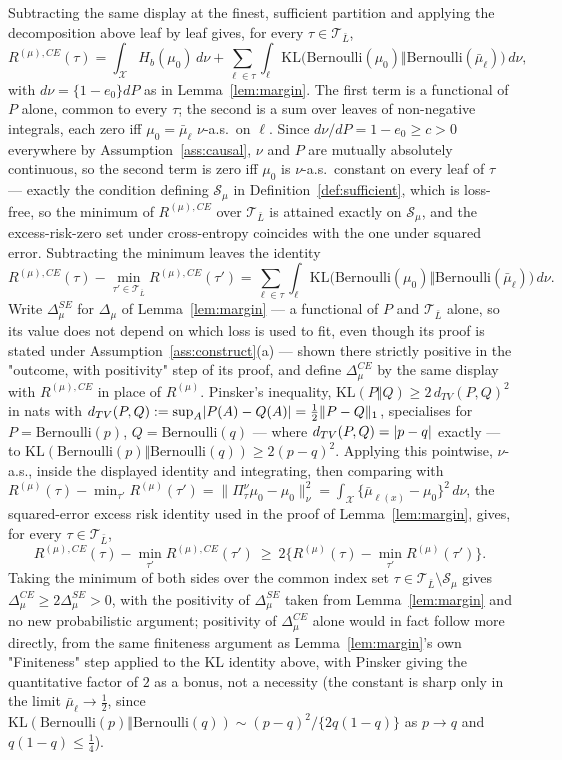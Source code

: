 \documentclass[11pt]{article}
\theoremstyle{plain}
\theoremstyle{definition}
\theoremstyle{remark}
\newcommand{\cX}{\mathcal{X}}
\newcommand{\cT}{\mathcal{T}}
\newcommand{\cS}{\mathcal{S}}
\newcommand{\ez}{e_0}
\newcommand{\mz}{\mu_0}
\DeclarePairedDelimiter{\abs}{\lvert}{\rvert}
\begin{document}
Subtracting the same display at the finest, sufficient partition and applying
the decomposition above leaf by leaf gives, for every $\tau\in\cT_{\bar L}$,
\[
  R^{(\mu),CE}(\tau)=\int_\cX H_b(\mz)\,d\nu
  +\sum_{\ell\in\tau}\int_\ell
  \mathrm{KL}\bigl(\mathrm{Bernoulli}(\mz)\Vert
  \mathrm{Bernoulli}(\bar\mu_\ell)\bigr)\,d\nu,
\]
with $d\nu=\{1-\ez\}dP$ as in Lemma~\ref{lem:margin}. The first term is a
functional of $P$ alone, common to every $\tau$; the second is a sum over
leaves of non-negative integrals, each zero iff $\mz=\bar\mu_\ell$
$\nu$-a.s.\ on $\ell$. Since $d\nu/dP=1-\ez\ge c>0$ everywhere by
Assumption~\ref{ass:causal}, $\nu$ and $P$ are mutually absolutely
continuous, so the second term is zero iff $\mz$ is
$\nu$-a.s.\ constant on every leaf of $\tau$ --- exactly the condition
defining $\cS_\mu$ in Definition~\ref{def:sufficient}, which is loss-free, so
the minimum of $R^{(\mu),CE}$ over $\cT_{\bar L}$ is attained exactly on
$\cS_\mu$, and the excess-risk-zero set under cross-entropy coincides with the
one under squared error. Subtracting the minimum leaves the identity
\[
  R^{(\mu),CE}(\tau)-\min_{\tau'\in\cT_{\bar L}}R^{(\mu),CE}(\tau')
  =\sum_{\ell\in\tau}\int_\ell
  \mathrm{KL}\bigl(\mathrm{Bernoulli}(\mz)\Vert
  \mathrm{Bernoulli}(\bar\mu_\ell)\bigr)\,d\nu.
\]
Write $\Delta_\mu^{SE}$ for $\Delta_\mu$ of Lemma~\ref{lem:margin} --- a
functional of $P$ and $\cT_{\bar L}$ alone, so its value does not depend on
which loss is used to fit, even though its proof is stated under
Assumption~\ref{ass:construct}(a) --- shown there strictly positive in the
"outcome, with positivity" step of its proof, and define $\Delta_\mu^{CE}$ by
the same display with $R^{(\mu),CE}$ in place of $R^{(\mu)}$. Pinsker's
inequality, $\mathrm{KL}(P\Vert Q)\ge2\,d_{TV}(P,Q)^2$ in nats with
$d_{TV}(P,Q):=\sup_A\abs{P(A)-Q(A)}=\tfrac12\|P-Q\|_1$, specialises for
$P=\mathrm{Bernoulli}(p)$, $Q=\mathrm{Bernoulli}(q)$ --- where
$d_{TV}(P,Q)=\abs{p-q}$ exactly --- to
$\mathrm{KL}(\mathrm{Bernoulli}(p)\Vert\mathrm{Bernoulli}(q))\ge2(p-q)^2$.
Applying this pointwise, $\nu$-a.s., inside the displayed identity and
integrating, then comparing with
$R^{(\mu)}(\tau)-\min_{\tau'}R^{(\mu)}(\tau')=\|\Pi^\nu_\tau\mz-\mz\|_\nu^2
=\int_\cX\{\bar\mu_{\ell(x)}-\mz\}^2\,d\nu$, the squared-error excess risk
identity used in the proof of Lemma~\ref{lem:margin}, gives, for every
$\tau\in\cT_{\bar L}$,
\[
  R^{(\mu),CE}(\tau)-\min_{\tau'}R^{(\mu),CE}(\tau')
  \ \ge\ 2\bigl\{R^{(\mu)}(\tau)-\min_{\tau'}R^{(\mu)}(\tau')\bigr\}.
\]
Taking the minimum of both sides over the common index set
$\tau\in\cT_{\bar L}\setminus\cS_\mu$ gives
$\Delta_\mu^{CE}\ge2\Delta_\mu^{SE}>0$, with the positivity of
$\Delta_\mu^{SE}$ taken from Lemma~\ref{lem:margin} and no new probabilistic
argument; positivity of $\Delta_\mu^{CE}$ alone would in fact follow more
directly, from the same finiteness argument as Lemma~\ref{lem:margin}'s own
"Finiteness" step applied to the KL identity above, with Pinsker giving the
quantitative factor of $2$ as a bonus, not a necessity (the constant is sharp
only in the limit $\bar\mu_\ell\to\tfrac12$, since
$\mathrm{KL}(\mathrm{Bernoulli}(p)\Vert\mathrm{Bernoulli}(q))\sim(p-q)^2/\{2q(1-q)\}$
as $p\to q$ and $q(1-q)\le\tfrac14$).
\end{document}
